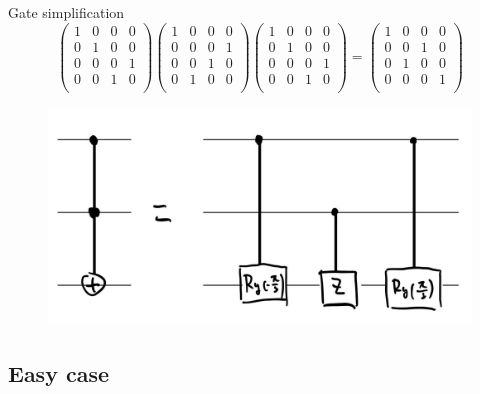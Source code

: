 \documentclass{beamer}
\begin{document}
\begin{frame}{Gate simplification}
	\begin{equation*}
		\begin{pmatrix}
			1 & 0 & 0 & 0 \\
			0 & 1 & 0 & 0 \\
			0 & 0 & 0 & 1 \\
			0 & 0 & 1 & 0 \\
		\end{pmatrix}
		\begin{pmatrix}
			1 & 0 & 0 & 0 \\
			0 & 0 & 0 & 1 \\
			0 & 0 & 1 & 0 \\
			0 & 1 & 0 & 0 \\
		\end{pmatrix}
		\begin{pmatrix}
			1 & 0 & 0 & 0 \\
			0 & 1 & 0 & 0 \\
			0 & 0 & 0 & 1 \\
			0 & 0 & 1 & 0 \\
		\end{pmatrix}
		=
		\begin{pmatrix}
			1 & 0 & 0 & 0 \\
			0 & 0 & 1 & 0 \\
			0 & 1 & 0 & 0 \\
			0 & 0 & 0 & 1 \\
		\end{pmatrix}
	\end{equation*}
	\begin{figure}[]
		\centering
		\includegraphics[width=0.5\linewidth]{./figs/toffoli.jpg}
	\end{figure}
	
\end{frame}

\subsection{Easy case}%
\label{sub:easy_case}
\end{document}
